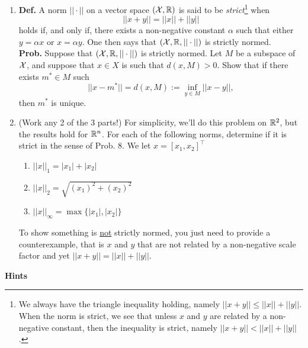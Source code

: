 \documentclass[letterpaper]{article}
\begin{document}
\begin{enumerate}
\newpage

\item \textbf{Def.} A norm $ ||\cdot ||$ on a vector space $({\cal X},\mathbb R) $  is said to be \textit{strict}\footnote{We always have the triangle inequality holding, namely $||x+y|| \le ||x|| + ||y||$.  When the norm is strict, we see that unless $x$ and $y$ are related by a non-negative constant, then the inequality is strict, namely $||x+y|| <  ||x|| + ||y||$.} when
$$ ||x+y|| = ||x|| + ||y||$$
holds if, and only if, there exists a non-negative constant $\alpha$  such that either $y = \alpha x$ or  $x = \alpha y$. One then says that $({\cal X},\mathbb R, || \cdot ||) $ is strictly normed. \\

\textbf{Prob.} Suppose that $({\cal X}, \mathbb R,  ||\cdot ||) $ is strictly normed. Let $M$ be a subspace of $\cal X$, and suppose that $x\in X$ is such that $d(x,M)>0$.  Show that if there exists $m^* \in M$ such
$$ ||x-m^*|| = d(x,M):=\inf_{y\in M} ||x-y||,$$
then $m^*$ is unique.


\item  (Work any 2 of the 3 parts!) For simplicity, we'll do this problem on $\mathbb R^2$, but the results hold for $\mathbb R^n$. For each of the following norms, determine if it is strict in the sense of Prob. 8. We let $x=[x_1,x_2]^\top$

       \begin{enumerate}
\setlength{\itemsep}{.1in}
\renewcommand{\labelenumi}{(\alph{enumi})}

    \item  $||x||_1 =  |x_1| + |x_2|$

    \item $||x||_2 =  \sqrt{(x_1)^2 + (x_2)^2}$

    \item $||x||_\infty = \max \{|x_1|, |x_2| \}$

\end{enumerate}
To show something is \underline{not} strictly normed, you just need to provide a counterexample, that is $x$ and $y$ that are not related by a non-negative scale factor and yet $ ||x+y|| = ||x|| + ||y||$.


\end{enumerate}

\newpage

\begin{center}
{\bf Hints}
\end{center}
\end{document}
